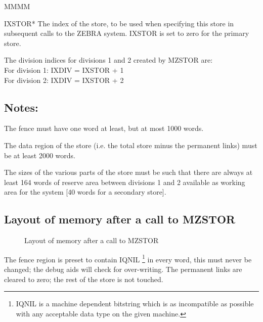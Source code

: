 \Odesc
\begin{DL}{MMMM}
\item[IXSTOR*]The index of the store,
to be used when specifying this store in subsequent calls
to the ZEBRA system. IXSTOR is set to zero for the primary store.
\end{DL}
\par The division indices for divisions 1 and 2 created by MZSTOR are:\\
For division 1:  IXDIV = IXSTOR + 1\\
For division 2:  IXDIV = IXSTOR + 2
\subsection{Notes:}
\par
\begin{UL}
\item The fence must have one word at least, but at most 1000 words.
\item The data region of the store
(i.e. the total store minus the permanent links)
must be at least 2000 words.
\item The sizes of the various parts of the store must be such
that there are always at least 164 words of reserve area
between divisions 1 and 2 available as working area for the system
[40 words for a secondary store].
\end{UL}
\subsection{Layout of memory after a call to MZSTOR}
\par
\begin{figure}[h]
\caption{Layout of memory after a call to MZSTOR}
\label{FMZSTOR}
\end{figure}
The fence region is preset to contain IQNIL
\footnote{IQNIL is a machine dependent bitstring which
is as incompatible as possible with any acceptable data type on the
given machine.}
in every word, this must never be changed;
the debug aids will check for over-writing.
The permanent links are cleared to zero; the rest of the store is not
touched.
